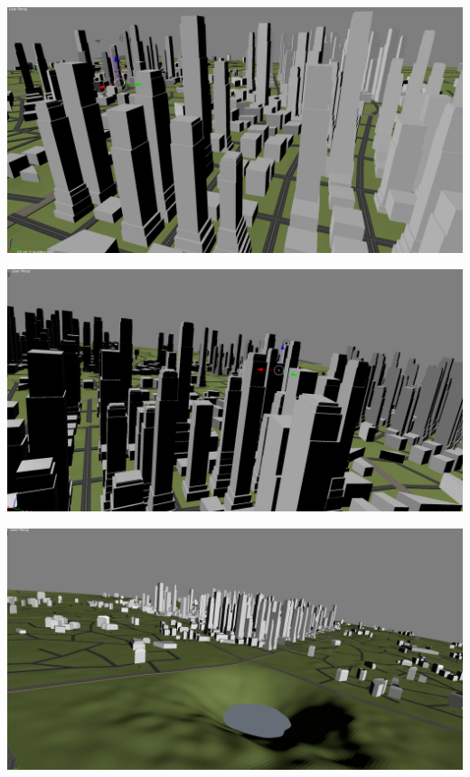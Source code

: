 \documentclass[a4paper,12pt]{scrartcl}
\begin{document}
\center
\includegraphics[width=\textheight,angle=90]{view2.png}

\center
\includegraphics[width=\textheight,angle=90]{view4.png}

\center
\includegraphics[width=\textheight,angle=90]{view5.png}
\end{document}
